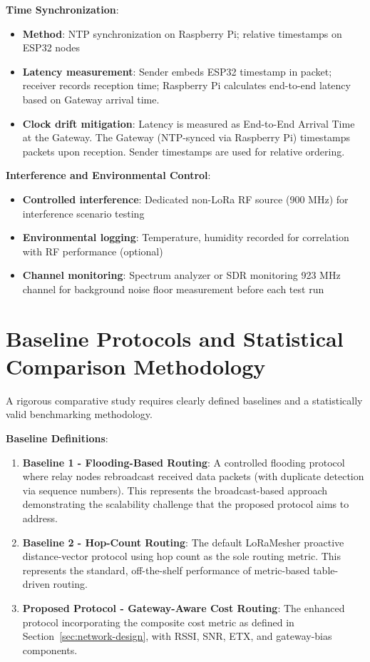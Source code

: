 \textbf{Time Synchronization}:

\begin{itemize}
\item \textbf{Method}: NTP synchronization on Raspberry Pi; relative timestamps on ESP32 nodes
\item \textbf{Latency measurement}: Sender embeds ESP32 timestamp in packet; receiver records reception time; Raspberry Pi calculates end-to-end latency based on Gateway arrival time.
\item \textbf{Clock drift mitigation}: Latency is measured as End-to-End Arrival Time at the Gateway. The Gateway (NTP-synced via Raspberry Pi) timestamps packets upon reception. Sender timestamps are used for relative ordering.
\end{itemize}

\textbf{Interference and Environmental Control}:

\begin{itemize}
\item \textbf{Controlled interference}: Dedicated non-LoRa RF source (900 MHz) for interference scenario testing
\item \textbf{Environmental logging}: Temperature, humidity recorded for correlation with RF performance (optional)
\item \textbf{Channel monitoring}: Spectrum analyzer or SDR monitoring 923 MHz channel for background noise floor measurement before each test run
\end{itemize}

\section{Baseline Protocols and Statistical Comparison Methodology}

A rigorous comparative study requires clearly defined baselines and a statistically valid benchmarking methodology.

\textbf{Baseline Definitions}:

\begin{enumerate}
\item \textbf{Baseline 1 - Flooding-Based Routing}: A controlled flooding protocol where relay nodes rebroadcast received data packets (with duplicate detection via sequence numbers). This represents the broadcast-based approach demonstrating the scalability challenge that the proposed protocol aims to address.

\item \textbf{Baseline 2 - Hop-Count Routing}: The default LoRaMesher proactive distance-vector protocol using hop count as the sole routing metric. This represents the standard, off-the-shelf performance of metric-based table-driven routing.

\item \textbf{Proposed Protocol - Gateway-Aware Cost Routing}: The enhanced protocol incorporating the composite cost metric as defined in Section~\ref{sec:network-design}, with RSSI, SNR, ETX, and gateway-bias components.
\end{enumerate}

